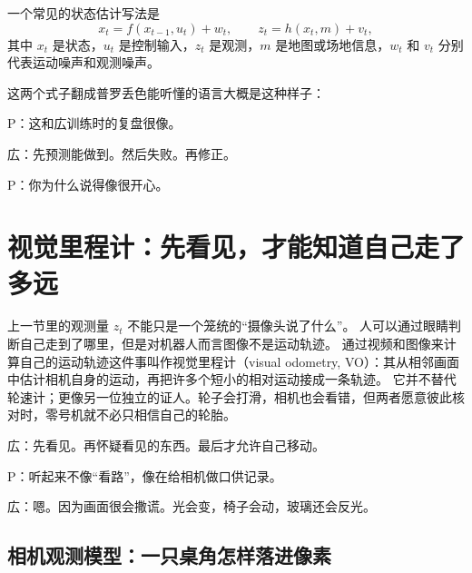 一个常见的状态估计写法是
\begin{equation}
x_t = f(x_{t-1}, u_t) + w_t, \qquad
z_t = h(x_t, m) + v_t,
\end{equation}
其中 $x_t$ 是状态，$u_t$ 是控制输入，$z_t$ 是观测，$m$ 是地图或场地信息，$w_t$ 和 $v_t$ 分别代表运动噪声和观测噪声。

这两个式子翻成普罗丢色能听懂的语言大概是这种样子：


P：这和広训练时的复盘很像。

広：先预测能做到。然后失败。再修正。

P：你为什么说得像很开心。

\section{视觉里程计：先看见，才能知道自己走了多远}

上一节里的观测量 $z_t$ 不能只是一个笼统的“摄像头说了什么”。
人可以通过眼睛判断自己走到了哪里，但是对机器人而言图像不是运动轨迹。
通过视频和图像来计算自己的运动轨迹这件事叫作视觉里程计（visual odometry, VO）：其从相邻画面中估计相机自身的运动，再把许多个短小的相对运动接成一条轨迹。
它并不替代轮速计；更像另一位独立的证人。轮子会打滑，相机也会看错，但两者愿意彼此核对时，零号机就不必只相信自己的轮胎\cite{nister2006vo,scaramuzza2011vo}。

広：先看见。再怀疑看见的东西。最后才允许自己移动。

P：听起来不像“看路”，像在给相机做口供记录。

広：嗯。因为画面很会撒谎。光会变，椅子会动，玻璃还会反光。

\subsection{相机观测模型：一只桌角怎样落进像素}

